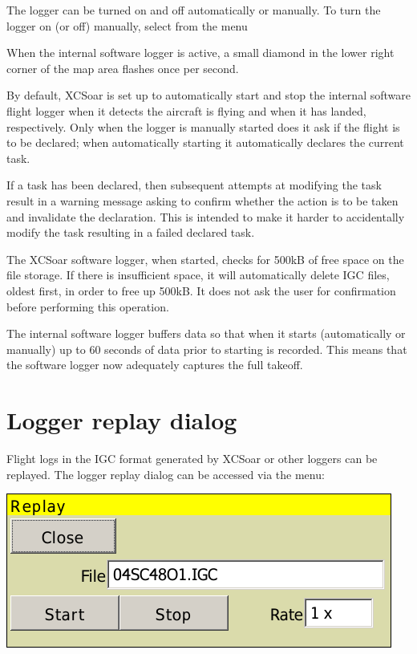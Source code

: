 The logger can be turned on and off automatically or manually.  
To turn the logger on (or off) manually, select from the menu
\begin{quote}
\blink{}
\end{quote}

When the internal software logger is active, a small diamond in the
lower right corner of the map area flashes once per second.

By default, XCSoar is set up to automatically start and stop the
internal software flight logger when it detects the aircraft is flying
and when it has landed, respectively.  Only when the logger is
manually started does it ask if the flight is to be declared; when
automatically starting it automatically declares the current task.

If a task has been declared, then subsequent attempts at modifying the
task result in a warning message asking to confirm whether the action
is to be taken and invalidate the declaration.  This is intended to
make it harder to accidentally modify the task resulting in a failed
declared task.

The XCSoar software logger, when started, checks for 500kB of free
space on the file storage.  If there is insufficient space, it will
automatically delete IGC files, oldest first, in order to free up
500kB.  It does not ask the user for confirmation before performing
this operation.

The internal software logger buffers data so that when it starts
(automatically or manually) up to 60 seconds of data prior to starting
is recorded.  This means that the software logger now adequately
captures the full takeoff.

\section{Logger replay dialog}

Flight logs in the IGC format generated by XCSoar or other loggers can
be replayed.  The logger replay dialog can be accessed via the
menu:
\begin{quote}
\blink{}
\end{quote}

\begin{center}
\includegraphics[angle=0,width=0.7\linewidth,keepaspectratio='true']{figures/loggerreplay.png}
\end{center}

